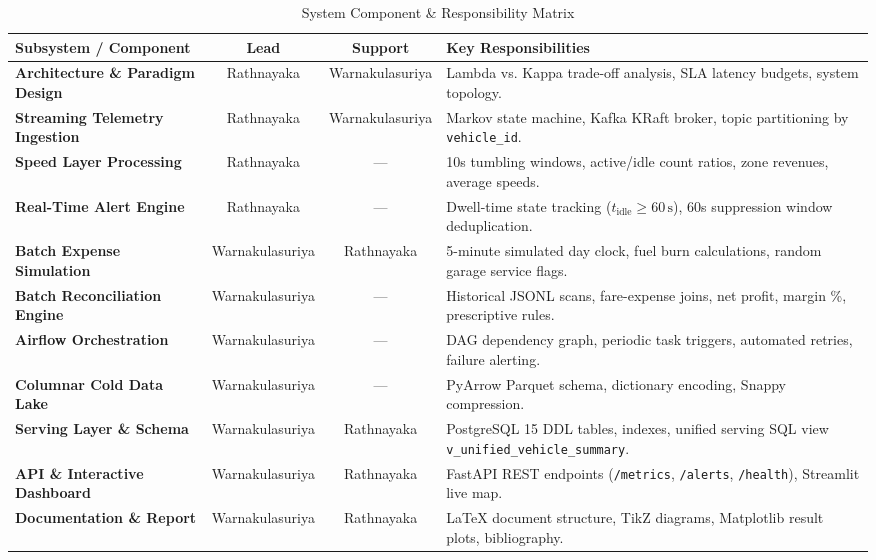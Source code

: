 \documentclass[11pt,a4paper]{article}
\begin{document}
\begin{table}[htbp]
\centering
\small
\caption{System Component \& Responsibility Matrix}
\label{tab:matrix}
\begin{tabularx}{\textwidth}{p{4.2cm} c c X}
\toprule
\textbf{Subsystem / Component} & \textbf{Lead} & \textbf{Support} & \textbf{Key Responsibilities} \\
\midrule
\textbf{Architecture \& Paradigm Design} & Rathnayaka & Warnakulasuriya & Lambda vs. Kappa trade-off analysis, SLA latency budgets, system topology. \\
\addlinespace
\textbf{Streaming Telemetry Ingestion} & Rathnayaka & Warnakulasuriya & Markov state machine, Kafka KRaft broker, topic partitioning by \texttt{vehicle\_id}. \\
\addlinespace
\textbf{Speed Layer Processing} & Rathnayaka & --- & 10s tumbling windows, active/idle count ratios, zone revenues, average speeds. \\
\addlinespace
\textbf{Real-Time Alert Engine} & Rathnayaka & --- & Dwell-time state tracking ($t_{\text{idle}} \ge 60\,\text{s}$), 60s suppression window deduplication. \\
\addlinespace
\textbf{Batch Expense Simulation} & Warnakulasuriya & Rathnayaka & 5-minute simulated day clock, fuel burn calculations, random garage service flags. \\
\addlinespace
\textbf{Batch Reconciliation Engine} & Warnakulasuriya & --- & Historical JSONL scans, fare-expense joins, net profit, margin \%, prescriptive rules. \\
\addlinespace
\textbf{Airflow Orchestration} & Warnakulasuriya & --- & DAG dependency graph, periodic task triggers, automated retries, failure alerting. \\
\addlinespace
\textbf{Columnar Cold Data Lake} & Warnakulasuriya & --- & PyArrow Parquet schema, dictionary encoding, Snappy compression. \\
\addlinespace
\textbf{Serving Layer \& Schema} & Warnakulasuriya & Rathnayaka & PostgreSQL 15 DDL tables, indexes, unified serving SQL view \texttt{v\_unified\_vehicle\_summary}. \\
\addlinespace
\textbf{API \& Interactive Dashboard} & Warnakulasuriya & Rathnayaka & FastAPI REST endpoints (\texttt{/metrics}, \texttt{/alerts}, \texttt{/health}), Streamlit live map. \\
\addlinespace
\textbf{Documentation \& Report} & Warnakulasuriya & Rathnayaka & LaTeX document structure, TikZ diagrams, Matplotlib result plots, bibliography. \\
\bottomrule
\end{tabularx}
\end{table}
\end{document}
